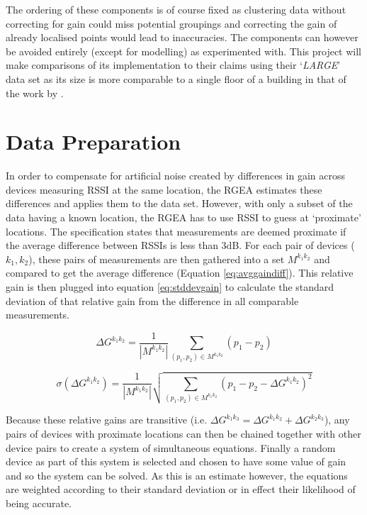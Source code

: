 \documentclass{UoYCSproject}
\begin{document}
            The ordering of these components is of course fixed as clustering data without correcting for gain could miss potential groupings and correcting the gain of already localised points would lead to inaccuracies. The components can however be avoided entirely (except for modelling) as \citeauthor{chintalapudi2010indoor} experimented with. This project will make comparisons of its implementation to their claims using their `\emph{LARGE}' data set as its size is more comparable to a single floor of a building in that of the work by \citet{torres2014ujiindoorloc}.
		
		\section{Data Preparation}
        \label{sec:dataprep}
        
            In order to compensate for artificial noise created by differences in gain across devices measuring RSSI at the same location, the RGEA estimates these differences and applies them to the data set. However, with only a subset of the data having a known location, the RGEA has to use RSSI to guess at `proximate' locations. The specification states that measurements are deemed proximate if the average difference between RSSIs is less than 3dB. For each pair of devices ($k_1,k_2$), these pairs of measurements are then gathered into a set $M^{k_1k_2}$ and compared to get the average difference (Equation \ref{eq:avggaindiff}). This relative gain is then plugged into equation \ref{eq:stddevgain} to calculate the standard deviation of that relative gain from the difference in all comparable measurements.
            
            \begin{equation}
            \label{eq:avggaindiff}
                \Delta G^{k_1k_2}=\dfrac{1}{|M^{k_1k_2}|} \sum_{(p_1,p_2)\in M^{k_1k_2}} (p_1 - p_2)
            \end{equation}
            
            \begin{equation}
            \label{eq:stddevgain}
                \sigma(\Delta G^{k_1k_2})=\dfrac{1}{|M^{k_1k_2}|} \sqrt{\sum_{(p_1,p_2)\in M^{k_1k_2}} (p_1 - p_2 - \Delta G^{k_1k_2})^2}
            \end{equation}
            
            Because these relative gains are transitive (i.e. $\Delta G^{k_1k_3} = \Delta G^{k_1k_2} + \Delta G^{k_2k_3}$), any pairs of devices with proximate locations can then be chained together with other device pairs to create a system of simultaneous equations. Finally a random device as part of this system is selected and chosen to have some value of gain and so the system can be solved. As this is an estimate however, the equations are weighted according to their standard deviation or in effect their likelihood of being accurate.
           
\end{document}
